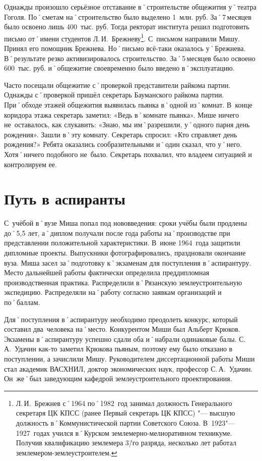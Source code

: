 Однажды произошло серьёзное отставание в˚строительстве общежития у˚театра Гоголя. По˚сметам на˚строительство было выделено 1~млн. руб. За˚7\,месяцев было освоено лишь 400~тыс. руб. Тогда ректорат института решил подготовить письмо от˚имени студентов Л.\,И.~Брежневу\footnote{Л.\,И.~Брежнев с˚1964 по˚1982~год занимал должность Генерального секретаря ЦК КПСС (ранее Первый секретарь ЦК КПСС) "--- высшую должность в˚Коммунистической партии Советского Союза. В~1923"---1927~годах учился в˚Курском землемерно-мелиоративном техникуме. Получив квалификацию землемера 3\=/го разряда, несколько лет работал землемером-землеустроителем.}. С~письмом направили Мишу. Принял его помощник Брежнева. Но˚письмо всё-таки оказалось у˚Брежнева. В˚результате резко активизировалось строительство. За˚5\,месяцев было освоено 600~тыс. руб. и˚общежитие своевременно было введено в˚эксплуатацию.

Часто посещали общежитие с˚проверкой представители райкома партии. Однажды с˚проверкой пришёл секретарь Бауманского райкома партии. При˚обходе этажей общежития выявилась пьянка в˚одной из˚комнат. В~конце коридора этажа секретарь заметил: «Ведь в˚комнате пьянка». Мише ничего не~оставалось, как слукавить: «Знаю, мы им˚разрешили, у˚одного парня день рождения». Зашли в˚эту комнату. Секретарь спросил: «Кто справляет день рождения?» Ребята оказались сообразительными и˚один сказал, что у˚него. Хотя˚ничего подобного не~было. Секретарь похвалил, что владеем ситуацией и контролируем ее.



\section*{Путь в аспиранты}
\label{sec:PathGraduateStudents}

С~учёбой в˚вузе Миша попал под нововведения: сроки учёбы были продлены до˚5,5 лет, а˚диплом получали после года работы на˚производстве при представлении положительной характеристики. В~июне 1964~года защитили дипломные проекты. Выпускники фотографировались, праздновали окончание вуза. Миша засел за˚подготовку к˚экзаменам для поступления в˚аспирантуру. Место дальнейшей работы фактически определила преддипломная производственная практика. Распределили в˚Рязанскую землеустроительную экспедицию. Распределяли на˚работу согласно заявкам организаций и по˚баллам.

Для˚поступления в˚аспирантуру необходимо преодолеть конкурс, который составил два~человека на˚место. Конкурентом Миши был Альберт Крюков. Экзамены в˚аспирантуру успешно сдали оба и˚набрали одинаковые балы. С.\,А.~Удачин как-то заметил Крюкова пьяным, поэтому ему было отказано в поступлении, а зачислили Мишу. Руководителем диссертационной работы Миши стал академик ВАСХНИЛ, доктор экономических наук, профессор С.\,А.~Удачин. Он~же˚был заведующим кафедрой землеустроительного проектирования.


